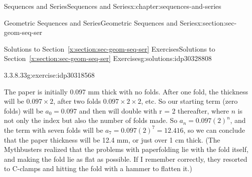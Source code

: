 \documentclass[twoside,10pt,]{book}
\newcommand{\xreffont}{\relax}
\numberwithin{equation}{section}
\providecommand\phantomsection{}
\begin{document}
\begin{chapterptx}{Sequences and Series}{}{Sequences and Series}{}{}{x:chapter:sequences-and-series}
\begin{sectionptx}{Geometric Sequences and Series}{}{Geometric Sequences and Series}{}{}{x:section:sec-geom-seq-ser}
\begin{solutions-subsection}{Solutions to Section~{\xreffont\ref*{x:section:sec-geom-seq-ser}} Exercises}{}{Solutions to Section~{\xreffont\ref*{x:section:sec-geom-seq-ser}} Exercises}{}{}{g:solutions:idp30328808}
\begin{divisionsolution}{3.3.8.33}{}{g:exercise:idp30318568}
\par\smallskip%
\noindent\hypertarget{g:solution:idp30318952-main}{}The paper is initially 0.097 mm thick with no folds.  After one fold, the thickness will be \(0.097\times2\), after two folds \(0.097\times2\times2\), etc.  So our starting term (zero folds) will be \(a_0=0.097\) and then will double with r = 2 thereafter, where \(n\) is not only the index but also the number of folds made. So \({a_n} = 0.097{\left( 2 \right)^n}\), and the term with seven folds will be \({a_7} = 0.097{\left( 2 \right)^7} = 12.416\), so we can conclude that the paper thickness will be 12.4 mm, or just over 1 cm thick. (The Mythbusters realized that the problems with paperfolding lie with the fold itself, and making the fold lie as flat as possible.  If I remember correctly, they resorted to C-clamps and hitting the fold with a hammer to flatten it.)\end{divisionsolution}%
\end{solutions-subsection}
\end{sectionptx}
\end{chapterptx}
%
\backmatter%
%
\clearpage\phantomsection%
%
%
{\xreffont\printindex}
%
\end{document}
